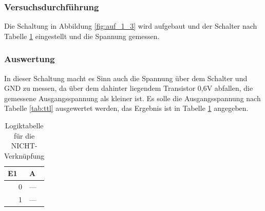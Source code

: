 \documentclass[12pt,a4paper]{article}
\begin{document}
\subsubsection*{Versuchsdurchführung}

Die Schaltung in Abbildung \ref{fig:auf_1_3} wird aufgebaut und der Schalter nach Tabelle \ref{tab:1_3} eingestellt und die Spannung gemessen.

\subsubsection*{Auswertung}

In dieser Schaltung macht es Sinn auch die Spannung über dem Schalter und GND zu messen, da über dem dahinter liegendem Transistor 0,6V abfallen, die gemessene Ausgangsspannung als kleiner ist. Es solle die Ausgangsspannung nach Tabelle \ref{tab:ttl} ausgewertet werden, das Ergebnis ist in Tabelle \ref{tab:1_3} angegeben.

\begin{table}[H]
\begin{center}
\begin{tabular}{r|l}

\multicolumn{1}{l|}{E1} & A \\ \hline \hline
0 & --- \\ 
1 & --- \\ 
\end{tabular}
\end{center}
\caption{Logiktabelle für die NICHT-Verknüpfung}
\label{tab:1_3}
\end{table}
\end{document}

